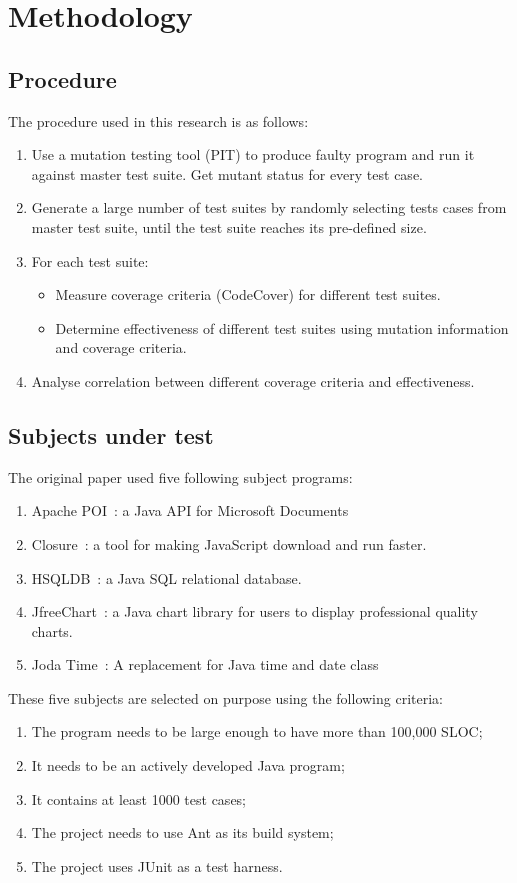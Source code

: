 \section{Methodology}
\subsection{Procedure}
The procedure used in this research is as follows:
\begin{enumerate}
	\item Use a mutation testing tool (PIT) to produce faulty program and run it against master test suite. Get mutant status for every test case.
	\item Generate a large number of test suites by randomly selecting tests cases from master test suite, until the test suite reaches its pre-defined size.
	\item For each test suite:
	\begin{itemize}
		\item Measure coverage criteria (CodeCover) for different test suites.
		\item Determine effectiveness of different test suites using mutation information and coverage criteria.
	\end{itemize}
	\item Analyse correlation between different coverage criteria and effectiveness.
\end{enumerate}

\subsection{Subjects under test}
The original paper used five following subject programs: 
\begin{enumerate}
	\item Apache POI~\cite{apachepoi}: a Java API for Microsoft Documents
	\item Closure~\cite{closure}: a tool for making JavaScript download and run faster.
	\item HSQLDB~\cite{hsqldb}: a Java SQL relational database.
	\item JfreeChart~\cite{jfreechart}: a Java chart library for users to display professional quality charts.
	\item Joda Time~\cite{jodatime}: A replacement for Java time and date class
\end{enumerate}

These five subjects are selected on purpose using the following criteria:
\begin{enumerate}
	\item The program needs to be large enough to have more than 100,000 SLOC;
	\item It needs to be an actively developed Java program;
	\item It contains at least 1000 test cases;
	\item The project needs to use Ant as its build system;
	\item The project uses JUnit as a test harness.
\end{enumerate}

